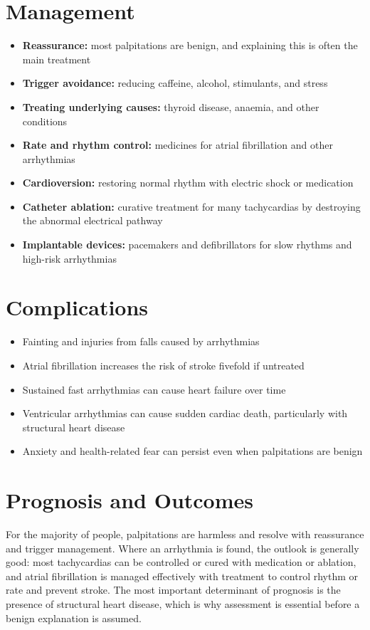 \section*{Management}
\begin{itemize}
    \item \textbf{Reassurance:} most palpitations are benign, and explaining this is often the main treatment
    \item \textbf{Trigger avoidance:} reducing caffeine, alcohol, stimulants, and stress
    \item \textbf{Treating underlying causes:} thyroid disease, anaemia, and other conditions
    \item \textbf{Rate and rhythm control:} medicines for atrial fibrillation and other arrhythmias
    \item \textbf{Cardioversion:} restoring normal rhythm with electric shock or medication
    \item \textbf{Catheter ablation:} curative treatment for many tachycardias by destroying the abnormal electrical pathway
    \item \textbf{Implantable devices:} pacemakers and defibrillators for slow rhythms and high-risk arrhythmias
\end{itemize}

\section*{Complications}
\begin{itemize}
    \item Fainting and injuries from falls caused by arrhythmias
    \item Atrial fibrillation increases the risk of stroke fivefold if untreated
    \item Sustained fast arrhythmias can cause heart failure over time
    \item Ventricular arrhythmias can cause sudden cardiac death, particularly with structural heart disease
    \item Anxiety and health-related fear can persist even when palpitations are benign
\end{itemize}

\section*{Prognosis and Outcomes}
For the majority of people, palpitations are harmless and resolve with reassurance and trigger management. Where an arrhythmia is found, the outlook is generally good: most tachycardias can be controlled or cured with medication or ablation, and atrial fibrillation is managed effectively with treatment to control rhythm or rate and prevent stroke. The most important determinant of prognosis is the presence of structural heart disease, which is why assessment is essential before a benign explanation is assumed.

